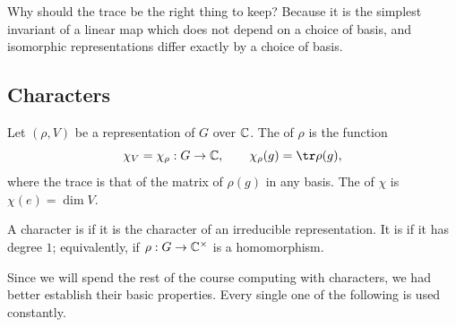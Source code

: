 \documentclass[a4paper]{scrartcl}
\begin{document}
Why should the trace be the right thing to keep? Because it is the simplest invariant of a linear map which does not depend on a choice of basis, and isomorphic representations differ exactly by a choice of basis.

\subsection{Characters}

\begin{definition}[Character]
	Let $(\rho, V)$ be a representation of $G$ over $\mathbb{C}$. The  of $\rho$ is the function
	$$\chi_V = \chi_\rho : G \to \C, \qquad \chi_\rho(g) = \tr \rho(g),$$
	where the trace is that of the matrix of $\rho(g)$ in any basis. The  of $\chi$ is $\chi(e) = \dim V$.
\end{definition}

\begin{definition}
	A character is  if it is the character of an irreducible representation. It is  if it has degree $1$; equivalently, if $\rho : G \to \mathbb{C}^\times$ is a homomorphism.
\end{definition}

Since we will spend the rest of the course computing with characters, we had better establish their basic properties. Every single one of the following is used constantly.
\end{document}
